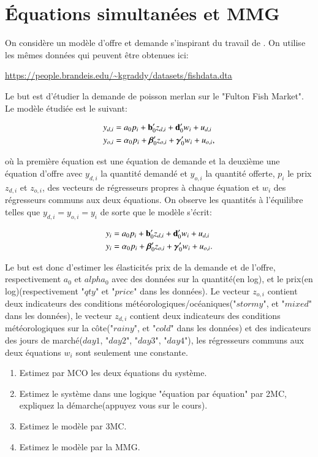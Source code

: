\section{Équations simultanées et MMG}

On considère un modèle d'offre et demande s'inspirant du travail de \cite{angrist2000}. 
On utilise les mêmes données qui peuvent être obtenues ici:

\medskip

\url{https://people.brandeis.edu/~kgraddy/datasets/fishdata.dta}

\medskip

Le but est d'étudier la demande de poisson merlan sur le "Fulton Fish Market". 
Le modèle étudiée est le suivant:

\begin{align*}
	y_{d, i} & = a_0 p_i + {\mathbf b}_0^\prime z_{d, i} +  {\mathbf d}_0^\prime w_i + u_{d, i}\\
	y_{o, i} & = \alpha_0 p_i + {\boldsymbol \beta}_0^\prime z_{o, i} + {\boldsymbol \gamma}_0^\prime w_i + u_{o, i},
\end{align*}

où la première équation est une équation de demande et la deuxième une équation d'offre avec $y_{d, i}$ la quantité demandé
et $y_{o, i}$ la quantité offerte, $p_i$ le prix $z_{d, i}$ et $z_{o, i}$, des 
vecteurs de régresseurs propres à chaque équation et $w_i$ des régresseurs communs aux deux équations.
On observe les quantités à l'équilibre telles que $y_{d, i} = y_{o, i} = y_i$ de sorte que le modèle
s'écrit:

\begin{align*}
	y_i & = a_0 p_i + {\mathbf b}_0^\prime z_{d, i} +  {\mathbf d}_0^\prime w_i + u_{d, i}\\
	y_i & = \alpha_0 p_i + {\boldsymbol \beta}_0^\prime z_{o, i} + {\boldsymbol \gamma}_0^\prime w_i + u_{o, i}.
\end{align*}

Le but est donc d'estimer les élasticités prix de la demande et de l'offre, respectivement $a_0$ et $alpha_0$ avec des
 données sur la quantité(en log), et le prix(en log)(respectivement "$qty$" et "$price$" dans les données).
Le vecteur $z_{o, i}$ contient deux indicateurs des conditions météorologiques/océaniques("$stormy$", et "$mixed$" 
dans les données), le vecteur $z_{d, i}$ contient deux indicateurs des conditions météorologiques 
sur la côte("$rainy$", et "$cold$" dans les données) et des indicateurs des jours de marché($day1$, "$day2$", 
"$day3$", "$day4$"), les régresseurs communs aux deux équations $w_i$ sont seulement une constante.

\begin{enumerate}
\item Estimez par MCO les deux équations du système. 
\item Estimez le système dans une logique "équation par équation" par 2MC, 
expliquez la démarche(appuyez vous sur le cours).
\item Estimez le modèle par 3MC. 
\item Estimez le modèle par la MMG.
\end{enumerate}





 
